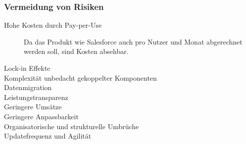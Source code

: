 \subsubsection{Vermeidung von Risiken}
\begin{description}
	\item[Hohe Kosten durch Pay-per-Use] Da das Produkt wie Salesforce auch 
pro Nutzer und Monat abgerechnet werden soll, sind Kosten absehbar.
	\item[Lock-in Effekte]
	\item[Komplexität unbedacht gekoppelter Komponenten]
	\item[Datenmigration]
	\item[Leistungstransparenz]
	\item[Geringere Umsätze]
	\item[Geringere Anpassbarkeit]
	\item[Organisatorische und strukturelle Umbrüche]
	\item[Updatefrequenz und Agilität]
\end{description}
